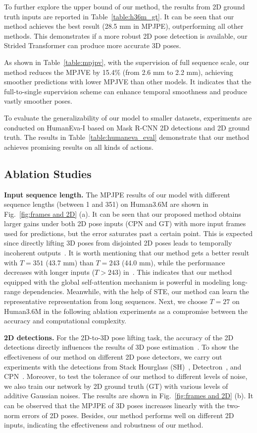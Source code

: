 \documentclass[journal]{IEEEtran}
\begin{document}
To further explore the upper bound of our method, the results from 2D ground truth inputs are reported in Table~\ref{table:h36m_gt}. 
It can be seen that our method achieves the best result (28.5 mm in MPJPE), outperforming all other methods. 
This demonstrates if a more robust 2D pose detection is available, our Strided Transformer can produce more accurate 3D poses. 

As shown in Table~\ref{table:mpjpv}, with the supervision of full sequence scale, our method reduces the MPJVE by 15.4\% (from 2.6 mm to 2.2 mm), achieving smoother predictions with lower MPJVE than other models.
It indicates that the full-to-single supervision scheme can enhance temporal smoothness and produce vastly smoother poses. 

To evaluate the generalizability of our model to smaller datasets, experiments are conducted on HumanEva-I based on Mask R-CNN 2D detections and 2D ground truth. 
The results in Table~\ref{table:humaneva_eval} demonstrate that our method achieves promising results on all kinds of actions. 

\subsection{Ablation Studies}
\textbf{Input sequence length.}
The MPJPE results of our model with different sequence lengths (between 1 and 351) on Human3.6M are shown in Fig.~\ref{fig:frames and 2D} (a). 
It can be seen that our proposed method obtains larger gains under both 2D pose inputs (CPN and GT) with more input frames used for predictions, but the error saturates past a certain point. 
This is expected since directly lifting 3D poses from disjointed 2D poses leads to temporally incoherent outputs~\cite{dabral2018learning}. 
It is worth mentioning that our method gets a better result with $T=351$ (43.7 mm) than $T=243$ (44.0 mm), while the performance decreases with longer inputs ($T>243$) in~\cite{liu2020attention}. 
This indicates that our method equipped with the global self-attention mechanism is powerful in modeling long-range dependencies. 
Meanwhile, with the help of STE, our method can learn the representative representation from long sequences. 
Next, we choose $T = 27$ on Human3.6M in the following ablation experiments as a compromise between the accuracy and computational complexity. 

\textbf{2D detections.}
For the 2D-to-3D pose lifting task, the accuracy of the 2D detections directly influences the results of 3D pose estimation~\cite{martinez2017simple}. 
To show the effectiveness of our method on different 2D pose detectors, we carry out experiments with the detections from Stack Hourglass (SH)~\cite{newell2016stacked}, Detectron~\cite{pavllo20193d}, and CPN~\cite{chen2018cascaded}. 
Moreover, to test the tolerance of our method to different levels of noise, we also train our network by 2D ground truth (GT) with various levels of additive Gaussian noises. 
The results are shown in Fig.~\ref{fig:frames and 2D} (b). 
It can be observed that the MPJPE of 3D poses increases linearly with the two-norm errors of 2D poses. 
Besides, our method performs well on different 2D inputs, indicating the effectiveness and robustness of our method.
\end{document}
